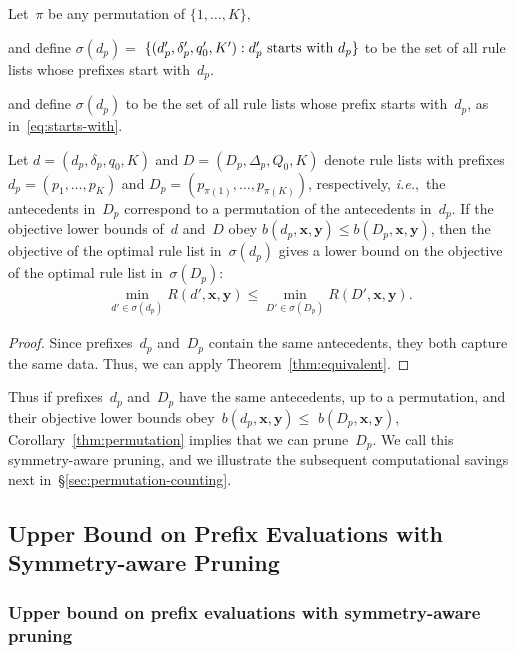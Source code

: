 \documentclass[twoside,11pt]{article}
\def\ie{{\it i.e.},~}
\newcommand{\x}{\mathbf{x}}
\newcommand{\y}{\mathbf{y}}
\def\RL{{d}}
\def\Prefix{d_p}
\def\Labels{\delta_p}
\def\Default{q_0}
\def\RLB{{D}}
\def\PrefixB{D_p}
\def\LabelsB{\Delta_p}
\def\DefaultB{Q_0}
\def\Obj{R}
\def\StartsWith{\sigma}
\newcommand{\nn}{\nonumber}
\begin{document}
\begin{corollary}
\label{thm:permutation}
Let~$\pi$ be any permutation of ${\{1, \dots, K\}}$,
\begin{arxiv}
and define ${\StartsWith(\Prefix) = }$
${\{(\Prefix', \Labels', \Default', K') : \Prefix' \textnormal{ starts with } \Prefix \}}$
to be the set of all rule lists whose prefixes start with~$\Prefix$.
\end{arxiv}
\begin{kdd}
and define $\StartsWith(\Prefix)$
to be the set of all rule lists whose prefix starts with~$\Prefix$,
as in~\eqref{eq:starts-with}.
\end{kdd}
%
Let ${\RL = (\Prefix, \Labels, \Default, K)}$
and ${\RLB = (\PrefixB, \LabelsB, \DefaultB, K)}$
denote rule lists with prefixes ${\Prefix = (p_1, \dots, p_K)}$
and ${\PrefixB = (p_{\pi(1)}, \dots, p_{\pi(K)})}$,
respectively, \ie the antecedents in~$\PrefixB$
correspond to a permutation of the antecedents in~$\Prefix$.
%
If the objective lower bounds of~$\RL$ and~$\RLB$
obey ${b(\Prefix, \x, \y) \le b(\PrefixB, \x, \y)}$,
then the objective of the optimal rule list in~$\StartsWith(\Prefix)$ gives a
lower bound on the objective of the optimal rule list in~$\StartsWith(\PrefixB)$:
\begin{align}
\min_{\RL' \in \StartsWith(\Prefix)} \Obj(\RL', \x, \y)
\le \min_{\RLB' \in \StartsWith(\PrefixB)} \Obj(\RLB', \x, \y). \nn
\end{align}
\end{corollary}

\begin{arxiv}
\begin{proof}
Since prefixes~$\Prefix$ and~$\PrefixB$ contain
the same antecedents, they both capture the same data.
Thus, we can apply Theorem~\ref{thm:equivalent}.
\end{proof}
\end{arxiv}

Thus if prefixes~$\Prefix$ and~$\PrefixB$ have the same antecedents,
up to a permutation, and their objective lower bounds
obey~${b(\Prefix, \x, \y) \le}$ ${b(\PrefixB, \x, \y)}$,
Corollary~\ref{thm:permutation} implies that we can prune~$\PrefixB$.
%
We call this %
symmetry-aware pruning,
and we illustrate the subsequent
computational savings next in~\S\ref{sec:permutation-counting}.

\begin{arxiv}
\subsection{Upper Bound on Prefix Evaluations with Symmetry-aware Pruning}
\end{arxiv}
\begin{kdd}
\subsubsection{Upper bound on prefix evaluations with symmetry-aware pruning}
\end{kdd}
\label{sec:permutation-counting}
\end{document}
